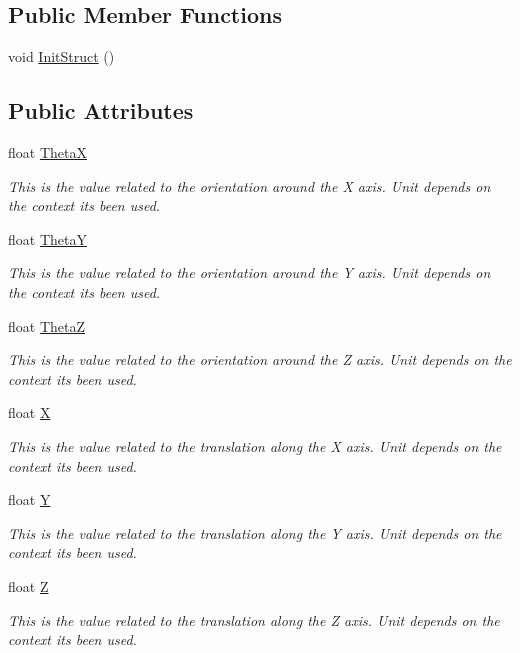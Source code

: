 \subsection*{Public Member Functions}
\begin{DoxyCompactItemize}
\item 
void \hyperlink{structCartesianInfo_a6d47623939d86124525ab4c8f7a2b8e9}{Init\+Struct} ()
\end{DoxyCompactItemize}
\subsection*{Public Attributes}
\begin{DoxyCompactItemize}
\item 
float \hyperlink{structCartesianInfo_a39135e53155aa4025c40eeefbfd3b17c}{ThetaX}
\begin{DoxyCompactList}\small\item\em This is the value related to the orientation around the X axis. Unit depends on the context it\textquotesingle{}s been used. \end{DoxyCompactList}\item 
float \hyperlink{structCartesianInfo_a4aef5897f4cdcf7ecc9df6804f844d46}{ThetaY}
\begin{DoxyCompactList}\small\item\em This is the value related to the orientation around the Y axis. Unit depends on the context it\textquotesingle{}s been used. \end{DoxyCompactList}\item 
float \hyperlink{structCartesianInfo_a2890c501f3b7b9479e12ad51f04f0a7f}{ThetaZ}
\begin{DoxyCompactList}\small\item\em This is the value related to the orientation around the Z axis. Unit depends on the context it\textquotesingle{}s been used. \end{DoxyCompactList}\item 
float \hyperlink{structCartesianInfo_a212cc2dcae1697132fc31fa2f5d17269}{X}
\begin{DoxyCompactList}\small\item\em This is the value related to the translation along the X axis. Unit depends on the context it\textquotesingle{}s been used. \end{DoxyCompactList}\item 
float \hyperlink{structCartesianInfo_a12c2611c89445419b336e58815d87c7c}{Y}
\begin{DoxyCompactList}\small\item\em This is the value related to the translation along the Y axis. Unit depends on the context it\textquotesingle{}s been used. \end{DoxyCompactList}\item 
float \hyperlink{structCartesianInfo_a14e196e4cb38c0ae7f4658b9b070b7fe}{Z}
\begin{DoxyCompactList}\small\item\em This is the value related to the translation along the Z axis. Unit depends on the context it\textquotesingle{}s been used. \end{DoxyCompactList}\end{DoxyCompactItemize}


